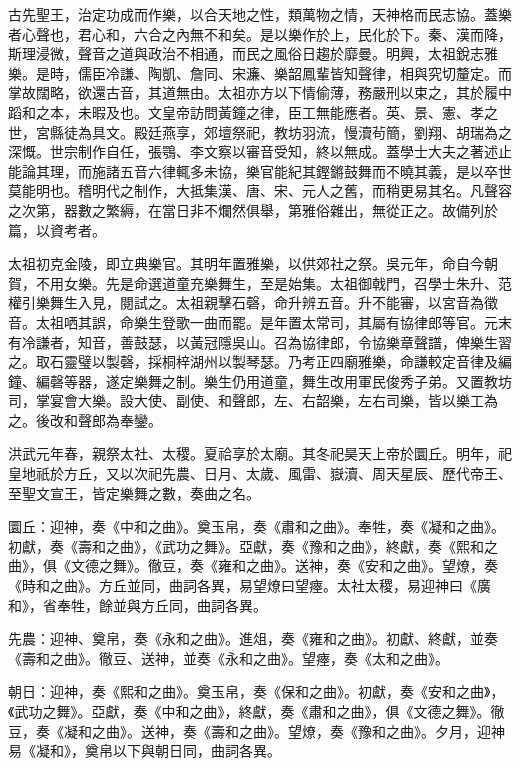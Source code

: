 

古先聖王，治定功成而作樂，以合天地之性，類萬物之情，天神格而民志協。蓋樂者心聲也，君心和，六合之內無不和矣。是以樂作於上，民化於下。秦、漢而降，斯理浸微，聲音之道與政治不相通，而民之風俗日趨於靡曼。明興，太祖銳志雅樂。是時，儒臣冷謙、陶凱、詹同、宋濂、樂韶鳳輩皆知聲律，相與究切釐定。而掌故闊略，欲還古音，其道無由。太祖亦方以下情偷薄，務嚴刑以束之，其於履中蹈和之本，未暇及也。文皇帝訪問黃鐘之律，臣工無能應者。英、景、憲、孝之世，宮縣徒為具文。殿廷燕享，郊壇祭祀，教坊羽流，慢瀆茍簡，劉翔、胡瑞為之深慨。世宗制作自任，張鶚、李文察以審音受知，終以無成。蓋學士大夫之著述止能論其理，而施諸五音六律輒多未協，樂官能紀其鏗鏘鼓舞而不曉其義，是以卒世莫能明也。稽明代之制作，大抵集漢、唐、宋、元人之舊，而稍更易其名。凡聲容之次第，器數之繁縟，在當日非不爛然俱舉，第雅俗雜出，無從正之。故備列於篇，以資考者。

太祖初克金陵，即立典樂官。其明年置雅樂，以供郊社之祭。吳元年，命自今朝賀，不用女樂。先是命選道童充樂舞生，至是始集。太祖御戟門，召學士朱升、范權引樂舞生入見，閱試之。太祖親擊石磬，命升辨五音。升不能審，以宮音為徵音。太祖哂其誤，命樂生登歌一曲而罷。是年置太常司，其屬有協律郎等官。元末有冷謙者，知音，善鼓瑟，以黃冠隱吳山。召為協律郎，令協樂章聲譜，俾樂生習之。取石靈璧以製磬，採桐梓湖州以製琴瑟。乃考正四廟雅樂，命謙較定音律及編鐘、編磬等器，遂定樂舞之制。樂生仍用道童，舞生改用軍民俊秀子弟。又置教坊司，掌宴會大樂。設大使、副使、和聲郎，左、右韶樂，左右司樂，皆以樂工為之。後改和聲郎為奉鑾。

洪武元年春，親祭太社、太稷。夏祫享於太廟。其冬祀昊天上帝於圜丘。明年，祀皇地祇於方丘，又以次祀先農、日月、太歲、風雷、嶽瀆、周天星辰、歷代帝王、至聖文宣王，皆定樂舞之數，奏曲之名。

圜丘：迎神，奏《中和之曲》。奠玉帛，奏《肅和之曲》。奉牲，奏《凝和之曲》。初獻，奏《壽和之曲》，《武功之舞》。亞獻，奏《豫和之曲》，終獻，奏《熙和之曲》，俱《文德之舞》。徹豆，奏《雍和之曲》。送神，奏《安和之曲》。望燎，奏《時和之曲》。方丘並同，曲詞各異，易望燎曰望瘞。太社太稷，易迎神曰《廣和》，省奉牲，餘並與方丘同，曲詞各異。

先農：迎神、奠帛，奏《永和之曲》。進俎，奏《雍和之曲》。初獻、終獻，並奏《壽和之曲》。徹豆、送神，並奏《永和之曲》。望瘞，奏《太和之曲》。

朝日：迎神，奏《熙和之曲》。奠玉帛，奏《保和之曲》。初獻，奏《安和之曲》，《武功之舞》。亞獻，奏《中和之曲》，終獻，奏《肅和之曲》，俱《文德之舞》。徹豆，奏《凝和之曲》。送神，奏《壽和之曲》。望燎，奏《豫和之曲》。夕月，迎神易《凝和》，奠帛以下與朝日同，曲詞各異。

